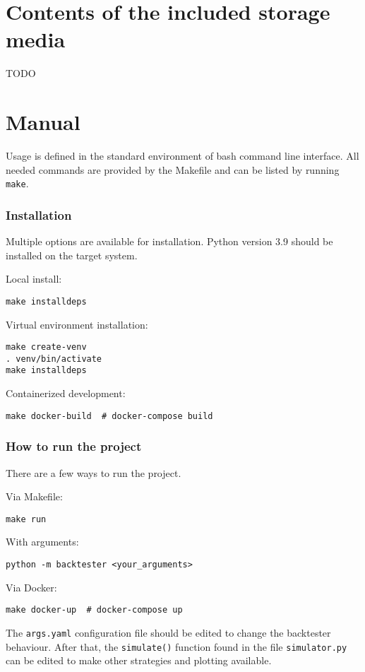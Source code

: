 


\chapter{Contents of the included storage media}
TODO

\chapter{Manual}
Usage is defined in the standard environment of bash command line interface. All needed commands are provided by the Makefile and can be listed by running \texttt{make}.

\subsection*{Installation}
Multiple options are available for installation. Python version 3.9 should be installed on the target system.

Local install:
\begin{verbatim}
make installdeps
\end{verbatim}

Virtual environment installation:
\begin{verbatim}
make create-venv
. venv/bin/activate
make installdeps
\end{verbatim}

Containerized development:
\begin{verbatim}
make docker-build  # docker-compose build
\end{verbatim}

\subsection*{How to run the project}
There are a few ways to run the project.

Via Makefile:
\begin{verbatim}
make run
\end{verbatim}

With arguments:
\begin{verbatim}
python -m backtester <your_arguments>
\end{verbatim}

Via Docker:
\begin{verbatim}
make docker-up  # docker-compose up
\end{verbatim}

The \texttt{args.yaml} configuration file should be edited to change the backtester behaviour. After that, the \texttt{simulate()} function found in the file \texttt{simulator.py} can be edited to make other strategies and plotting available.
